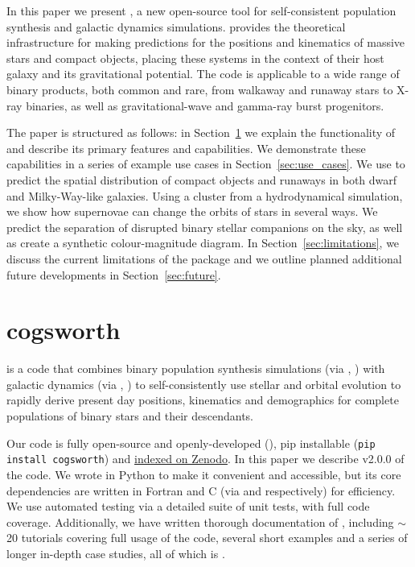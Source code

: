 \documentclass[twocolumn, twocolappendix, oneside]{aastex631}
\begin{document}
In this paper we present \cogsworth, a new open-source tool for self-consistent population synthesis and galactic dynamics simulations. \cogsworth provides the theoretical infrastructure for making predictions for the positions and kinematics of massive stars and compact objects, placing these systems in the context of their host galaxy and its gravitational potential. The code is applicable to a wide range of binary products, both common and rare, from walkaway and runaway stars to X-ray binaries, as well as gravitational-wave and gamma-ray burst progenitors.

The paper is structured as follows: in Section~\ref{sec:cogsworth} we explain the functionality of \cogsworth and describe its primary features and capabilities. We demonstrate these capabilities in a series of example use cases in Section~\ref{sec:use_cases}. We use \cogsworth to predict the spatial distribution of compact objects and runaways in both dwarf and Milky-Way-like galaxies. Using a cluster from a hydrodynamical simulation, we show how supernovae can change the orbits of stars in several ways. We predict the separation of disrupted binary stellar companions on the sky, as well as create a synthetic \gaia colour-magnitude diagram. In Section~\ref{sec:limitations}, we discuss the current limitations of the package and we outline planned additional future developments in Section~\ref{sec:future}.

\section{cogsworth}\label{sec:cogsworth}

\cogsworth is a code that combines binary population synthesis simulations (via \cosmic, \citealp{COSMIC}) with galactic dynamics (via \gala, \citealp{Gala}) to self-consistently use stellar and orbital evolution to rapidly derive present day positions, kinematics and demographics for complete populations of binary stars and their descendants. 

Our code is fully open-source and openly-developed (), pip installable (\texttt{pip install cogsworth}) and \href{https://zenodo.org/records/13709381}{indexed on Zenodo}. In this paper we describe v2.0.0 of the code. We wrote \cogsworth in Python to make it convenient and accessible, but its core dependencies are written in Fortran and C (via \cosmic and \gala respectively) for efficiency. We use automated testing via a detailed suite of unit tests, with full code coverage. Additionally, we have written thorough documentation of \cogsworth, including $\sim$20 tutorials covering full usage of the code, several short examples and a series of longer in-depth case studies, all of which is .
\end{document}
